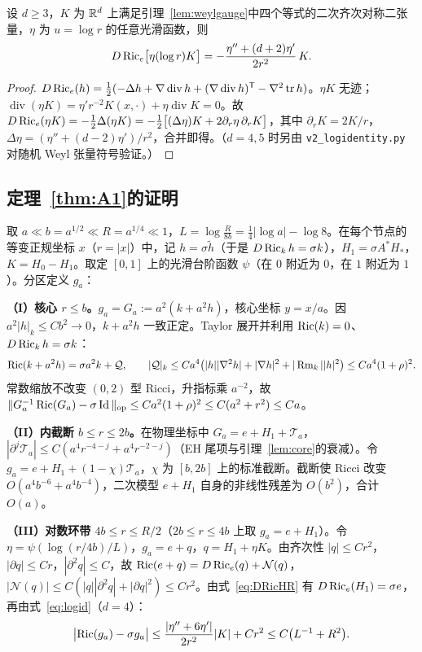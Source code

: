 \begin{lemma}[对数插值恒等式]\label{lem:logid}
设 $d\ge3$，$K$ 为 $\mathbb R^d$ 上满足引理~\ref{lem:weylgauge}中四个等式的二次齐次对称二张量，$\eta$ 为 $u=\log r$ 的任意光滑函数，则
\begin{equation}\label{eq:logid}
D\operatorname{Ric}_e\bigl[\eta(\log r)K\bigr]=-\frac{\eta''+(d+2)\eta'}{2r^2}\,K .
\end{equation}
\end{lemma}
\begin{proof}
$D\operatorname{Ric}_e(h)=\frac12(-\Delta h+\nabla\operatorname{div}h+(\nabla\operatorname{div}h)^{\mathsf T}-\nabla^2\operatorname{tr} h)$。$\eta K$ 无迹；$\operatorname{div}(\eta K)=\eta'r^{-2}K(x,\cdot)+\eta\operatorname{div}K=0$。故 $D\operatorname{Ric}_e(\eta K)=-\frac12\Delta(\eta K)=-\frac12\bigl[(\Delta\eta)K+2\partial_r\eta\,\partial_rK\bigr]$，其中 $\partial_rK=2K/r$，$\Delta\eta=(\eta''+(d-2)\eta')/r^2$，合并即得。（$d=4,5$ 时另由 \texttt{v2\_logidentity.py} 对随机 Weyl 张量符号验证。）
\end{proof}

\subsection{定理~\ref{thm:A1}的证明}
取 $a\ll b=a^{1/2}\ll R=a^{1/4}\ll1$，$L=\log\frac{R}{8b}=\frac14|\log a|-\log8$。在每个节点的等变正规坐标 $x$（$r=|x|$）中，记 $h=\sigma\tilde h$（于是 $D\operatorname{Ric}_kh=\sigma k$），$H_1=\sigma A^*H_*$，$K=H_0-H_1$。取定 $[0,1]$ 上的光滑台阶函数 $\psi$（在 $0$ 附近为 $0$，在 $1$ 附近为 $1$）。分区定义 $g_a$：

\textbf{（I）核心 $r\le b$。}$g_a=G_a:=a^2(k+a^2h)$，核心坐标 $y=x/a$。因 $a^2|h|_k\le Cb^2\to0$，$k+a^2h$ 一致正定。Taylor 展开并利用 $\operatorname{Ric}(k)=0$、$D\operatorname{Ric}_kh=\sigma k$：
\[
\operatorname{Ric}(k+a^2h)=\sigma a^2k+\mathcal Q,\qquad |\mathcal Q|_k\le Ca^4\bigl(|h||\nabla^2h|+|\nabla h|^2+|\operatorname{Rm}_k||h|^2\bigr)\le Ca^4(1+\rho)^2 .
\]
常数缩放不改变 $(0,2)$ 型 Ricci，升指标乘 $a^{-2}$，故 $\|G_a^{-1}\operatorname{Ric}(G_a)-\sigma\operatorname{Id}\|_{\mathrm{op}}\le Ca^2(1+\rho)^2\le C(a^2+r^2)\le Ca$。

\textbf{（II）内截断 $b\le r\le2b$。}在物理坐标中 $G_a=e+H_1+\mathcal T_a$，$|\partial^j\mathcal T_a|\le C(a^4r^{-4-j}+a^4r^{-2-j})$（EH 尾项与引理~\ref{lem:core}的衰减）。令 $g_a=e+H_1+(1-\chi)\mathcal T_a$，$\chi$ 为 $[b,2b]$ 上的标准截断。截断使 Ricci 改变 $O(a^4b^{-6}+a^4b^{-4})$，二次模型 $e+H_1$ 自身的非线性残差为 $O(b^2)$，合计 $O(a)$。

\textbf{（III）对数环带 $4b\le r\le R/2$}（$2b\le r\le4b$ 上取 $g_a=e+H_1$）。令 $\eta=\psi(\log(r/4b)/L)$，$g_a=e+q$，$q=H_1+\eta K$。由齐次性 $|q|\le Cr^2$，$|\partial q|\le Cr$，$|\partial^2q|\le C$，故 $\operatorname{Ric}(e+q)=D\operatorname{Ric}_e(q)+\mathcal N(q)$，$|\mathcal N(q)|\le C(|q||\partial^2q|+|\partial q|^2)\le Cr^2$。由式~\eqref{eq:DRicHR} 有 $D\operatorname{Ric}_e(H_1)=\sigma e$，再由式~\eqref{eq:logid}（$d=4$）：
\[
\bigl|\operatorname{Ric}(g_a)-\sigma g_a\bigr|\le\frac{|\eta''+6\eta'|}{2r^2}|K|+Cr^2\le C\bigl(L^{-1}+R^2\bigr).
\]

